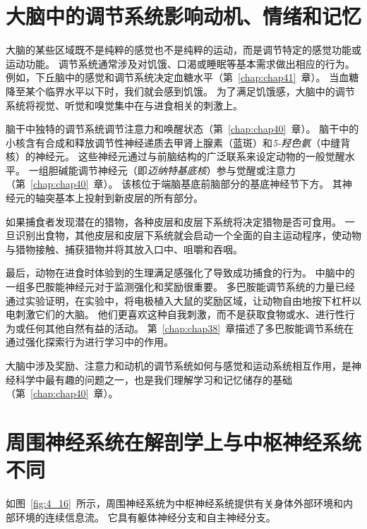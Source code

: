 \section{大脑中的调节系统影响动机、情绪和记忆}

大脑的某些区域既不是纯粹的感觉也不是纯粹的运动，而是调节特定的感觉功能或运动功能。
调节系统通常涉及对饥饿、口渴或睡眠等基本需求做出相应的行为。
例如，下丘脑中的感觉和调节系统决定血糖水平（第~\ref{chap:chap41}~章）。
当血糖降至某个临界水平以下时，我们就会感到饥饿。
为了满足饥饿感，大脑中的调节系统将视觉、听觉和嗅觉集中在与进食相关的刺激上。


脑干中独特的调节系统调节注意力和唤醒状态（第~\ref{chap:chap40}~章）。 
脑干中的小核含有合成和释放调节性神经递质去甲肾上腺素（蓝斑）和\textit{5-羟色氨}（中缝背核）的神经元。 
这些神经元通过与前脑结构的广泛联系来设定动物的一般觉醒水平。 
一组胆碱能调节神经元（即\textit{迈纳特基底核}）参与觉醒或注意力（第~\ref{chap:chap40}~章）。
该核位于端脑基底前脑部分的基底神经节下方。 
其神经元的轴突基本上投射到新皮层的所有部分。


如果捕食者发现潜在的猎物，各种皮层和皮层下系统将决定猎物是否可食用。 
一旦识别出食物，其他皮层和皮层下系统就会启动一个全面的自主运动程序，使动物与猎物接触、捕获猎物并将其放入口中、咀嚼和吞咽。


最后，动物在进食时体验到的生理满足感强化了导致成功捕食的行为。
中脑中的一组多巴胺能神经元对于监测强化和奖励很重要。 
多巴胺能调节系统的力量已经通过实验证明，在实验中，将电极植入大鼠的奖励区域，让动物自由地按下杠杆以电刺激它们的大脑。 
他们更喜欢这种自我刺激，而不是获取食物或水、进行性行为或任何其他自然有益的活动。 
第~\ref{chap:chap38}~章描述了多巴胺能调节系统在通过强化探索行为进行学习中的作用。


大脑中涉及奖励、注意力和动机的调节系统如何与感觉和运动系统相互作用，是神经科学中最有趣的问题之一，也是我们理解学习和记忆储存的基础（第~\ref{chap:chap40}~章）。



\section{周围神经系统在解剖学上与中枢神经系统不同}

如图~\ref{fig:4_16}~所示，周围神经系统为中枢神经系统提供有关身体外部环境和内部环境的连续信息流。
它具有躯体神经分支和自主神经分支。


